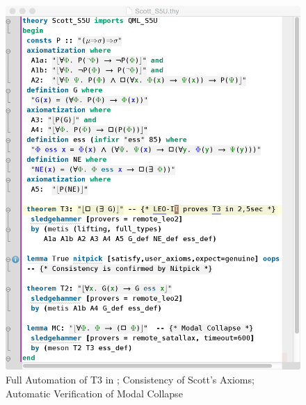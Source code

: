 \documentclass{article}
\begin{document}
\begin{figure}[t]
\centerline{\includegraphics[width=1\columnwidth]{./Images/Scott_S5U.png}}
\caption{Full Automation of T3 in \SFiveU; Consistency of Scott's
  Axioms;  Automatic Verification of Modal Collapse} \label{Scott_S5U}
\end{figure}

\end{document}
